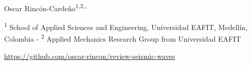 \documentclass[11pt,twoside]{article}
\begin{document}
\begin{tcolorbox}[colback=white!20,colframe=gray!20,sharp corners]

{\begin{center}
Oscar Rincón-Cardeño\textsuperscript{1,2,,
}
\end{center}
}

\vspace{-0.3cm}

{\footnotesize
\textsuperscript{1} School of Applied Sciences and Engineering, Universidad EAFIT, 
Medellín, Colombia - \textsuperscript{2} Applied Mechanics Research Group from Universidad EAFIT
}


{\noindent\footnotesize{\href{https://github.com/oscar-rincon/review-seismic-waves}
{\textcolor{gray}{\faGithubSquare} https://github.com/oscar-rincon/review-seismic-waves}}}

\end{tcolorbox}

\end{document}
